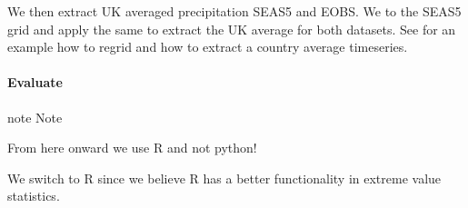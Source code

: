 \documentclass[letterpaper,10pt,english]{sphinxmanual}
\begin{document}
{
\begin{sphinxVerbatim}[commandchars=\\\{\}]
\llap{\color{nbsphinxin}[10]:\,\hspace{\fboxrule}\hspace{\fboxsep}}  \PYG{p}{[}\PYG{p}{]} 
 
\end{sphinxVerbatim}
}

We then extract UK averaged precipitation SEAS5 and EOBS. We  to the SEAS5 grid and apply the same  to extract the UK average for both datasets. See  for an example how to regrid and how to extract a country average timeseries.


\paragraph{Evaluate}
\label{\detokenize{Notebooks/examples/UK_Precipitation:Evaluate}}
\begin{sphinxadmonition}{note}{}\unskip
Note

From here onward we use R and not python!

We switch to R since we believe R has a better functionality in extreme value statistics.
\end{sphinxadmonition}
\end{document}

